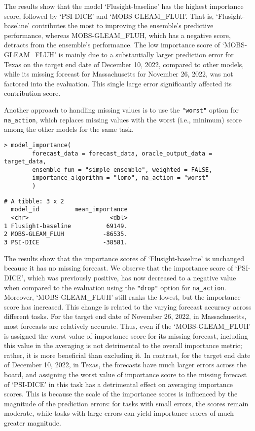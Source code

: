 \documentclass[
  article,
  shortnames,
  notitle]{jss}
\begin{document}
\normalsize

The results show that the model `Flusight-baseline' has the highest
importance score, followed by `PSI-DICE' and `MOBS-GLEAM\_FLUH'. That
is, `Flusight-baseline' contributes the most to improving the ensemble's
predictive performance, whereas MOBS-GLEAM\_FLUH, which has a negative
score, detracts from the ensemble's performance. The low importance
score of `MOBS-GLEAM\_FLUH' is mainly due to a substantially larger
prediction error for Texas on the target end date of December 10, 2022,
compared to other models, while its missing forecast for Massachusetts
for November 26, 2022, was not factored into the evaluation. This single
large error significantly affected its contribution score.

Another approach to handling missing values is to use the
\texttt{"worst"} option for \texttt{na\_action}, which replaces missing
values with the worst (i.e., minimum) score among the other models for
the same task.

\begin{verbatim}
> model_importance(
        forecast_data = forecast_data, oracle_output_data = target_data,
        ensemble_fun = "simple_ensemble", weighted = FALSE,
        importance_algorithm = "lomo", na_action = "worst"
        )
\end{verbatim}

\small

\begin{verbatim}
# A tibble: 3 x 2
  model_id          mean_importance
  <chr>                       <dbl>
1 Flusight-baseline          69149.
2 MOBS-GLEAM_FLUH           -86535.
3 PSI-DICE                  -38581.
\end{verbatim}

\normalsize

The results show that the importance scores of `Flusight-baseline' is
unchanged because it has no missing forecast. We observe that the
importance score of `PSI-DICE', which was previously positive, has now
decreased to a negative value when compared to the evaluation using the
\texttt{"drop"} option for \texttt{na\_action}. Moreover,
`MOBS-GLEAM\_FLUH' still ranks the lowest, but the importance score has
increased. This change is related to the varying forecast accuracy
across different tasks. For the target end date of November 26, 2022, in
Massachusetts, most forecasts are relatively accurate. Thus, even if the
`MOBS-GLEAM\_FLUH' is assigned the worst value of importance score for
its missing forecast, including this value in the averaging is not
detrimental to the overall importance metric; rather, it is more
beneficial than excluding it. In contrast, for the target end date of
December 10, 2022, in Texas, the forecasts have much larger errors
across the board, and assigning the worst value of importance score to
the missing forecast of `PSI-DICE' in this task has a detrimental effect
on averaging importance scores. This is because the scale of the
importance scores is influenced by the magnitude of the prediction
errors: for tasks with small errors, the scores remain moderate, while
tasks with large errors can yield importance scores of much greater
magnitude.
\end{document}
